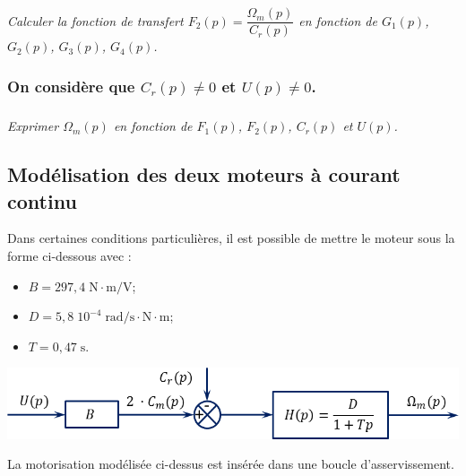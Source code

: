 \documentclass[10pt]{article}
\newif\ifprof
\begin{document}
\subparagraph{}
\textit{Calculer la fonction de transfert $F_2 (p)=\dfrac{\Omega_m (p)}{C_r (p)}$ en fonction de $G_1(p)$, $G_2(p)$, $G_3(p)$, $G_4 (p)$.}

\ifprof
\begin{corrige}
\end{corrige}
\else
\fi

\subsubsection*{On considère que $C_r (p)\neq0$ et $U(p)\neq0$.}

\subparagraph{}
\textit{Exprimer $\Omega_m(p)$ en fonction de $F_1 (p)$, $F_2 (p)$, $C_r (p)$ et $U(p)$.}
\ifprof
\begin{corrige}
\end{corrige}
\else
\fi

\subsection*{Modélisation des deux moteurs à courant continu}

\vspace{.25cm}

\begin{minipage}[c]{.4\linewidth}
Dans certaines conditions particulières, il est possible de mettre le moteur sous la forme ci-dessous avec :
\begin{itemize}
\item $B=297,4\; \text{N}\cdot \text{m⁄V}$;
\item $D=5,8\;10^{-4} \;  \text{rad⁄s}\cdot \text{N}\cdot\text{m}$;
\item $T=0,47\;\text{s}$.
\end{itemize}
\end{minipage}\hfill
\begin{minipage}[c]{.59\linewidth}
\begin{center}
\includegraphics[width=.9\textwidth]{images/SchemaBloc_02}
\end{center}
\end{minipage}

\vspace{.25cm}

La motorisation modélisée ci-dessus est insérée dans une boucle d’asservissement.
\end{document}
